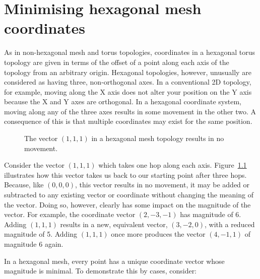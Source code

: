 \chapter{Minimising hexagonal mesh coordinates}
	\label{app:minimal-hex-coordinates}
	
	As in non-hexagonal mesh and torus topologies, coordinates in a hexagonal
	torus topology are given in terms of the offset of a point along each axis of
	the topology from an arbitrary origin. Hexagonal topologies, however,
	unusually are considered as having three, non-orthogonal axes. In a
	conventional 2D topology, for example, moving along the X axis does not alter
	your position on the Y axis because the X and Y axes are orthogonal. In a
	hexagonal coordinate system, moving along any of the three axes results in
	some movement in the other two.  A consequence of this is that multiple
	coordinates may exist for the same position.
	
	\begin{figure}
		\center
		\caption[$(1,1,1)$ in a hexagonal mesh or torus.]%
		{The vector $(1, 1, 1)$ in a hexagonal mesh topology results in
		no movement.}
		\label{fig:hex-mesh-loop}
	\end{figure}
	
	Consider the vector $(1,1,1)$ which takes one hop along each axis.
	Figure~\ref{fig:hex-mesh-loop} illustrates how this vector takes us back to
	our starting point after three hops. Because, like $(0,0,0)$, this vector
	results in no movement, it may be added or subtracted to any existing vector
	or coordinate without changing the meaning of the vector. Doing so, however,
	clearly has some impact on the magnitude of the vector. For example, the
	coordinate vector $(2, -3, -1)$ has magnitude of 6. Adding $(1,1,1)$ results
	in a new, equivalent vector, $(3, -2, 0)$, with a reduced magnitude of 5.
	Adding $(1,1,1)$ once more produces the vector $(4, -1, 1)$ of magnitude 6
	again.
	
	In a hexagonal mesh, every point has a unique coordinate vector whose
	magnitude is minimal. To demonstrate this by cases, consider:
	
